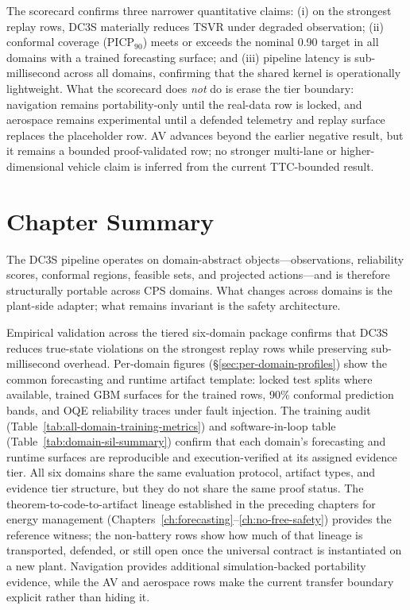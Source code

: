 The scorecard confirms three narrower quantitative claims: (i) on the
strongest replay rows, DC3S materially reduces TSVR under degraded
observation; (ii) conformal coverage (PICP$_{90}$) meets or exceeds the
nominal 0.90 target in all domains with a trained forecasting surface;
and (iii) pipeline latency is sub-millisecond across all domains,
confirming that the shared kernel is operationally lightweight.  What the
scorecard does \emph{not} do is erase the tier boundary: navigation remains
portability-only until the real-data row is locked, and aerospace remains
experimental until a defended telemetry and replay surface replaces the
placeholder row.  AV advances beyond the earlier negative result, but it
remains a bounded proof-validated row; no stronger multi-lane or higher-dimensional
vehicle claim is inferred from the current TTC-bounded result.

\section{Chapter Summary}

The DC3S pipeline operates on domain-abstract objects---observations,
reliability scores, conformal regions, feasible sets, and projected
actions---and is therefore structurally portable across CPS domains.
What changes across domains is the plant-side adapter; what remains
invariant is the safety architecture.

Empirical validation across the tiered six-domain package confirms that
DC3S reduces true-state violations on the strongest replay rows while
preserving sub-millisecond overhead.  Per-domain figures
(\S\ref{sec:per-domain-profiles}) show the common forecasting and runtime
artifact template: locked test splits where available, trained GBM
surfaces for the trained rows, 90\% conformal prediction bands, and OQE
reliability traces under fault injection.  The training audit
(Table~\ref{tab:all-domain-training-metrics}) and software-in-loop table
(Table~\ref{tab:domain-sil-summary}) confirm that each domain's
forecasting and runtime surfaces are reproducible and execution-verified
at its assigned evidence tier.  All six domains share the same
evaluation protocol, artifact types, and evidence tier structure, but
they do not share the same proof status.  The theorem-to-code-to-artifact
lineage established in the preceding chapters for energy management
(Chapters~\ref{ch:forecasting}--\ref{ch:no-free-safety}) provides the
reference witness; the non-battery rows show how much of that lineage is
transported, defended, or still open once the universal contract is
instantiated on a new plant.  Navigation provides additional
simulation-backed portability evidence, while the AV and aerospace rows
make the current transfer boundary explicit rather than hiding it.
